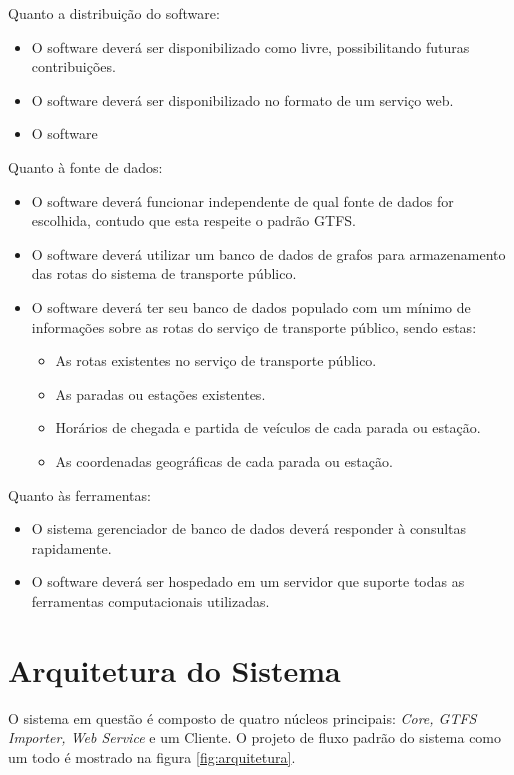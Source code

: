 Quanto a distribuição do software:
\begin{itemize}
	\item O software deverá ser disponibilizado como livre, possibilitando futuras contribuições.
	\item O software deverá ser disponibilizado no formato de um serviço web.
	\item O software 
\end{itemize}

Quanto à fonte de dados:
\begin{itemize}
	\item O software deverá funcionar independente de qual fonte de dados for escolhida, contudo que esta respeite o padrão GTFS.
	\item O software deverá utilizar um banco de dados de grafos para armazenamento das rotas do sistema de transporte público.
	\item O software deverá ter seu banco de dados populado com um mínimo de informações sobre as rotas do serviço de transporte público, sendo estas:
	\begin{itemize}
		\item As rotas existentes no serviço de transporte público.
		\item As paradas ou estações existentes.
		\item Horários de chegada e partida de veículos de cada parada ou estação.
		\item As coordenadas geográficas de cada parada ou estação.
	\end{itemize}
\end{itemize}

Quanto às ferramentas:
\begin{itemize}
	\item O sistema gerenciador de banco de dados deverá responder à consultas rapidamente.
	\item O software deverá ser hospedado em um servidor que suporte todas as ferramentas computacionais utilizadas.
\end{itemize}


\section{Arquitetura do Sistema}
O sistema em questão é composto de quatro núcleos principais: \emph{Core, GTFS Importer, Web Service} e um Cliente. 
O projeto de fluxo padrão do sistema como um todo é mostrado na figura \ref{fig:arquitetura}.

